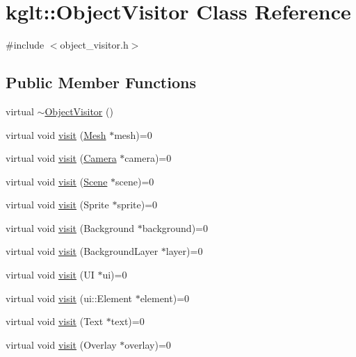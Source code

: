 \hypertarget{classkglt_1_1_object_visitor}{\section{kglt\-:\-:Object\-Visitor Class Reference}
\label{classkglt_1_1_object_visitor}
}


{\ttfamily \#include $<$object\-\_\-visitor.\-h$>$}

\subsection*{Public Member Functions}
\begin{DoxyCompactItemize}
\item 
virtual \hyperlink{classkglt_1_1_object_visitor_ae6c9ea44e7aeb613aa0c59927f0ddb52}{$\sim$\-Object\-Visitor} ()
\item 
virtual void \hyperlink{classkglt_1_1_object_visitor_a4bf8855e1c314819dace5e7d753d8097}{visit} (\hyperlink{classkglt_1_1_mesh}{Mesh} $\ast$mesh)=0
\item 
virtual void \hyperlink{classkglt_1_1_object_visitor_a18815965b5711a54b9001018c4b0ba3a}{visit} (\hyperlink{classkglt_1_1_camera}{Camera} $\ast$camera)=0
\item 
virtual void \hyperlink{classkglt_1_1_object_visitor_ad0d9ba9987420f73192252b342fbcc9e}{visit} (\hyperlink{classkglt_1_1_scene}{Scene} $\ast$scene)=0
\item 
virtual void \hyperlink{classkglt_1_1_object_visitor_a84a58b4802f91f30cbaf59f89eb0e243}{visit} (Sprite $\ast$sprite)=0
\item 
virtual void \hyperlink{classkglt_1_1_object_visitor_a8452f72628ff1c16d508202a0c99677c}{visit} (Background $\ast$background)=0
\item 
virtual void \hyperlink{classkglt_1_1_object_visitor_a0bee6a6b86964adc8c6153e6f9aee754}{visit} (Background\-Layer $\ast$layer)=0
\item 
virtual void \hyperlink{classkglt_1_1_object_visitor_ac5ec43623c0d0abba8a22faa7b385bba}{visit} (U\-I $\ast$ui)=0
\item 
virtual void \hyperlink{classkglt_1_1_object_visitor_a2ef493060ce0b95c38d6e2e6b61b260c}{visit} (ui\-::\-Element $\ast$element)=0
\item 
virtual void \hyperlink{classkglt_1_1_object_visitor_aef0f520413ad607c53f6a3aad6c2ec23}{visit} (Text $\ast$text)=0
\item 
virtual void \hyperlink{classkglt_1_1_object_visitor_a5fc202e2edc5dcae612bfad152a586f1}{visit} (Overlay $\ast$overlay)=0

\end{DoxyCompactItemize}
